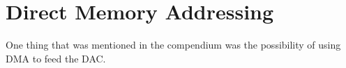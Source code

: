 \section{Direct Memory Addressing}

One thing that was mentioned in the compendium was the possibility of using DMA to feed the DAC.
